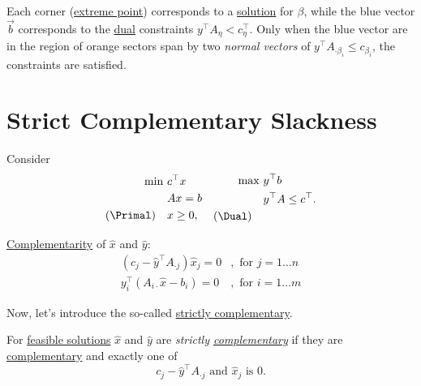 \begin{remark}
	Each corner (\hyperref[def:extreme-point]{extreme point}) corresponds to a \hyperref[def:solution]{solution} for \(\beta\), while the blue vector \(\vec{b}\) corresponds to the \hyperref[def:dual]{dual} constraints \(y^{\top} A_{\eta}<c_{\eta}^{\top}\). Only when the blue vector are in the region of orange sectors span by two \emph{normal vectors} of \(y^{\top}A_{\cdot \beta_i}\leq c_{\beta_i}\), the constraints are satisfied.
\end{remark}

\section{Strict Complementary Slackness}
Consider
\[
	\begin{aligned}
		\min~          & c^{\top}x \\
		               & Ax = b    \\
		(\Primal)\quad & x\geq  0,
	\end{aligned}\quad \begin{aligned}
		\max ~       & y^{\top}b               \\
		             & y^{\top}A\leq c^{\top}. \\
		(\Dual)\quad &
	\end{aligned}
\]

\begin{prev}
	\hyperref[def:complementary]{Complementarity} of \(\hat{x}\) and \(\hat{y}\)\(\colon\)
	\[
		\begin{split}
			(c_{j} - \hat{y}^{\top} A_{\cdot j}) \hat{x}_j = 0 & , \text{ for }j = 1\dots n  \\
			y^{\top}_i (A_{i\cdot}\hat{x} - b_{i}) = 0         & , \text{ for } i = 1\dots m
		\end{split}
	\]
\end{prev}

Now, let's introduce the so-called \hyperref[def:strictly-complementary]{ strictly complementary}.

\begin{definition}\label{def:strictly-complementary}
	For \hyperref[def:feasible-solution]{feasible solutions} \(\hat{x}\) and \(\hat{y}\) are \emph{strictly \hyperref[def:complementary]{complementary}} if
	they are \hyperref[def:complementary]{complementary} and exactly one of
	\[
		c_{j} - \hat{y}^{\top}A_{\cdot j}\text{ and }\hat{x}_j \text{ is } 0.
	\]
\end{definition}

